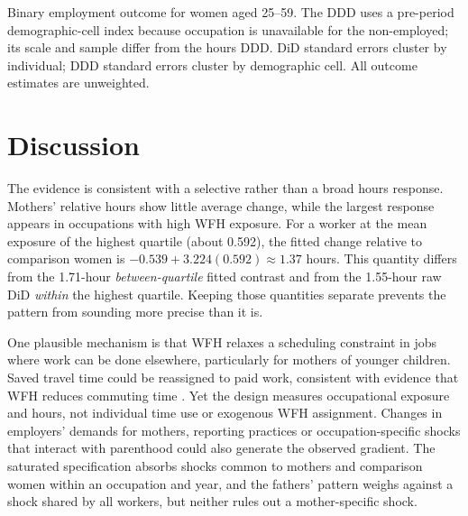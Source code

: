 \documentclass[12pt,a4paper]{article}
\begin{document}
\begin{table}[htbp]\centering\begin{threeparttable}
\caption{Employment outcomes as a secondary analysis}\label{tab:employment}
\renewcommand{\baselinestretch}{1}\small\setlength{\tabcolsep}{5pt}

\begin{tablenotes}\footnotesize\item Binary employment outcome for women aged 25--59. The DDD uses a pre-period demographic-cell index because occupation is unavailable for the non-employed; its scale and sample differ from the hours DDD. DiD standard errors cluster by individual; DDD standard errors cluster by demographic cell. All outcome estimates are unweighted.\end{tablenotes}
\end{threeparttable}\end{table}

\section{Discussion}\label{sec:discussion}
The evidence is consistent with a selective rather than a broad hours response. Mothers' relative hours show little average change, while the largest response appears in occupations with high WFH exposure. For a worker at the mean exposure of the highest quartile (about 0.592), the fitted change relative to comparison women is $-0.539+3.224(0.592)\approx1.37$ hours. This quantity differs from the 1.71-hour \emph{between-quartile} fitted contrast and from the 1.55-hour raw DiD \emph{within} the highest quartile. Keeping those quantities separate prevents the pattern from sounding more precise than it is.

One plausible mechanism is that WFH relaxes a scheduling constraint in jobs where work can be done elsewhere, particularly for mothers of younger children. Saved travel time could be reassigned to paid work, consistent with evidence that WFH reduces commuting time \citep{aksoy2023}. Yet the design measures occupational exposure and hours, not individual time use or exogenous WFH assignment. Changes in employers' demands for mothers, reporting practices or occupation-specific shocks that interact with parenthood could also generate the observed gradient. The saturated specification absorbs shocks common to mothers and comparison women within an occupation and year, and the fathers' pattern weighs against a shock shared by all workers, but neither rules out a mother-specific shock.
\end{document}

